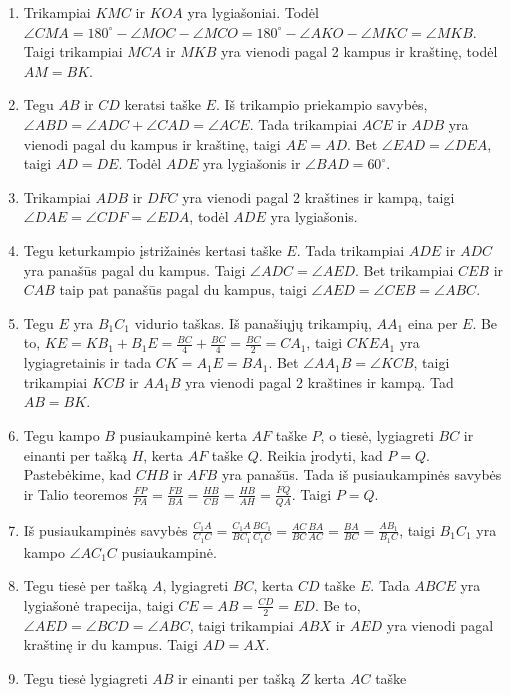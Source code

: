\begin{enumerate}
\item
  Trikampiai $KMC$ ir $KOA$ yra lygiašoniai. Todėl $\angle CMA = 180^\circ
  - \angle MOC - \angle MCO = 180^\circ - \angle AKO - \angle MKC = \angle
  MKB$. Taigi trikampiai $MCA$ ir $MKB$ yra vienodi pagal 2 kampus ir
  kraštinę, todėl $AM = BK$.
\item
  Tegu $AB$ ir $CD$ keratsi taške $E$. Iš trikampio priekampio savybės,
  $\angle ABD = \angle ADC + \angle CAD = \angle ACE$. Tada trikampiai
  $ACE$ ir $ADB$ yra vienodi pagal du kampus ir kraštinę, taigi $AE = AD$.
  Bet $\angle EAD =\angle DEA$, taigi $AD = DE$. Todėl $ADE$ yra
  lygiašonis ir $\angle BAD = 60^\circ$.
\item
  Trikampiai $ADB$ ir $DFC$ yra vienodi pagal 2 kraštines ir kampą, taigi
  $\angle DAE = \angle CDF = \angle EDA$, todėl $ADE$ yra lygiašonis. 
\item
  Tegu keturkampio įstrižainės kertasi taške $E$. Tada trikampiai $ADE$ ir
  $ADC$ yra panašūs pagal du kampus.  Taigi $\angle ADC = \angle AED$. Bet
  trikampiai $CEB$ ir $CAB$ taip pat panašūs pagal du kampus, taigi
  $\angle AED = \angle CEB = \angle ABC$. 
\item
  Tegu $E$ yra $B_1C_1$ vidurio taškas. Iš panašiųjų trikampių, $AA_1$
  eina per $E$. Be to, $KE = KB_1 + B_1E = \frac{BC}{4} + \frac{BC}{4} =
  \frac{BC}{2} = CA_1$, taigi $CKEA_1$ yra lygiagretainis ir tada $CK =
  A_1E = BA_1$. Bet $\angle AA_1B = \angle KCB$, taigi trikampiai $KCB$ ir
  $AA_1B$ yra vienodi pagal 2 kraštines ir kampą.  Tad $AB = BK$.
\item
  Tegu kampo $B$ pusiaukampinė kerta $AF$ taške $P$, o tiesė, lygiagreti
  $BC$ ir einanti per tašką $H$, kerta $AF$ taške $Q$. Reikia įrodyti, kad
  $P = Q$. Pastebėkime, kad $CHB$ ir $AFB$ yra panašūs. Tada iš
  pusiaukampinės savybės ir Talio teoremos $\frac{FP}{PA} = \frac{FB}{BA}
  = \frac{HB}{CB} = \frac{HB}{AH} = \frac{FQ}{QA}$. Taigi $P=Q$.
\item
  Iš pusiaukampinės savybės $\frac{C_1A}{C_1C} =
  \frac{C_1A}{BC_1}\frac{BC_1}{C_1C} = \frac{AC}{BC} \frac{BA}{AC} =
  \frac{BA}{BC} = \frac{AB_1}{B_1C}$, taigi $B_1C_1$ yra kampo $\angle
  AC_1C$ pusiaukampinė. 
\item
  Tegu tiesė per tašką $A$, lygiagreti $BC$, kerta $CD$ taške $E$. Tada
  $ABCE$ yra lygiašonė trapecija, taigi $CE = AB = \frac{CD}{2} = ED$. Be
  to, $\angle AED = \angle BCD = \angle ABC$, taigi trikampiai $ABX$ ir
  $AED$ yra vienodi pagal kraštinę ir du kampus. Taigi $AD = AX$.
\item
  Tegu tiesė lygiagreti $AB$ ir einanti per tašką $Z$ kerta $AC$ taške

\end{enumerate}
